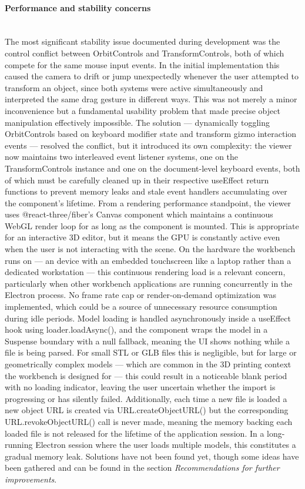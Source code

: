 \documentclass[a4paper,12pt]{article}
\begin{document}
\paragraph{Performance and stability concerns}\mbox{} \\
The most significant stability issue documented during development was the control conflict between OrbitControls and TransformControls, both of which compete for the same mouse input events. In the initial implementation this caused the camera to drift or jump unexpectedly whenever the user attempted to transform an object, since both systems were active simultaneously and interpreted the same drag gesture in different ways. This was not merely a minor inconvenience but a fundamental usability problem that made precise object manipulation effectively impossible. The solution — dynamically toggling OrbitControls based on keyboard modifier state and transform gizmo interaction events — resolved the conflict, but it introduced its own complexity: the viewer now maintains two interleaved event listener systems, one on the TransformControls instance and one on the document-level keyboard events, both of which must be carefully cleaned up in their respective useEffect return functions to prevent memory leaks and stale event handlers accumulating over the component's lifetime.
From a rendering performance standpoint, the viewer uses @react-three/fiber's Canvas component which maintains a continuous WebGL render loop for as long as the component is mounted. This is appropriate for an interactive 3D editor, but it means the GPU is constantly active even when the user is not interacting with the scene. On the hardware the workbench runs on — an device with an embedded touchscreen like a laptop rather than a dedicated workstation — this continuous rendering load is a relevant concern, particularly when other workbench applications are running concurrently in the Electron process. No frame rate cap or render-on-demand optimization was implemented, which could be a source of unnecessary resource consumption during idle periods.
Model loading is handled asynchronously inside a useEffect hook using loader.loadAsync(), and the component wraps the model in a Suspense boundary with a null fallback, meaning the UI shows nothing while a file is being parsed. 
\newpage
For small STL or GLB files this is negligible, but for large or geometrically complex models — which are common in the 3D printing context the workbench is designed for — this could result in a noticeable blank period with no loading indicator, leaving the user uncertain whether the import is progressing or has silently failed. 
Additionally, each time a new file is loaded a new object URL is created via URL.createObjectURL() but the corresponding URL.revokeObjectURL() call is never made, meaning the memory backing each loaded file is not released for the lifetime of the application session. 
In a long-running Electron session where the user loads multiple models, this constitutes a gradual memory leak.
Solutions have not been found yet, though some ideas have been gathered and can be found in the section \textit{Recommendations for further improvements}. 
\end{document}
